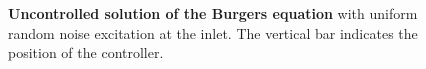 \begin{figure}
\centering
\caption{\textbf{Uncontrolled solution of the Burgers equation} with uniform random noise excitation at the inlet. The vertical bar indicates the position of the controller.}
\label{fig:burgers_free}
\end{figure} 
